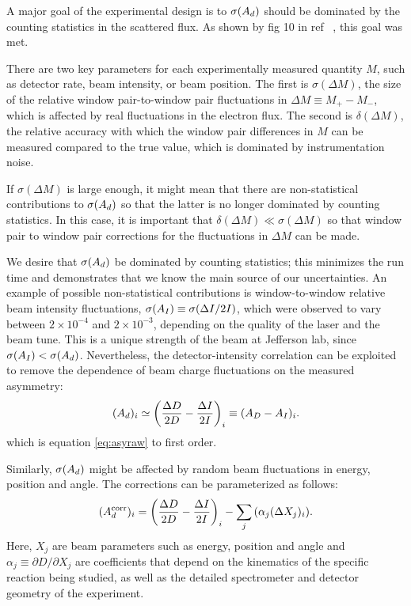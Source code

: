 A major goal of the experimental design is to $\sigma(A_d)$ should be
dominated by the counting statistics in the scattered flux.
As shown by fig 10 in ref ~\cite{ref:pvdis_nim}, this goal was met.

There are two key parameters for each experimentally measured
quantity $M$, such as detector rate, beam intensity, or beam position. 
The first is $\sigma(\Delta M)$, the size of the relative 
window pair-to-window pair
fluctuations in $\Delta M\equiv M_{+} - M_{-}$, which is affected by
real fluctuations in the electron flux. The second is
$\delta(\Delta M)$, the relative accuracy with which the window
pair differences in $M$ can be measured compared to the true
value, which is dominated by instrumentation noise.

If $\sigma(\Delta M)$ is large enough, it might mean that there
are non-statistical contributions to $\sigma(A_d)$ so that the
latter is no longer dominated by counting statistics. In this
case, it is important that $\delta(\Delta M)\ll\sigma(\Delta M)$ so
that window pair to window pair corrections for the fluctuations
in $\Delta M$ can be made.

We desire that $\sigma(A_d)$ be dominated by counting statistics;
this minimizes the run time and demonstrates that we know
the main source of our uncertainties.
An example of possible non-statistical contributions
is window-to-window relative beam intensity
fluctuations, $\sigma(A_I) \equiv \sigma(\Delta I/2I)$,
which were observed to vary between $2\times 10^{-4}$ and
$2\times 10^{-3}$, depending on the quality of the laser and the
beam tune. This is a unique strength of the beam at 
Jefferson lab, since $\sigma(A_I)<\sigma(A_d)$. 
Nevertheless, the
detector-intensity correlation can be exploited to remove the
dependence of beam charge fluctuations on the measured asymmetry:
\begin{equation}
(A_d)_i \simeq
\left(\frac{\Delta D}{2D} - \frac{\Delta I}{2I}\right)_i \equiv
(A_D - A_I)_i.
\end{equation}
which is equation \ref{eq:asyraw} to first order.

Similarly, $\sigma(A_d)$ might be affected by random beam
fluctuations in energy, position and angle. The corrections can be
parameterized as follows:
\begin{equation}
(A^{\rm corr}_d)_i = \left(\frac{\Delta D}{2D} - \frac{\Delta I}{2I}\right)_i
-\sum_j{\left( {\alpha_j(\Delta X_j)_i}\right)}.
\end{equation}
Here, $X_j$ are beam parameters such as energy, position and
angle and $\alpha_j \equiv \partial D/\partial X_j$ are
coefficients that depend on the kinematics of the specific
reaction being studied, as well as the detailed spectrometer and
detector geometry of the experiment.

